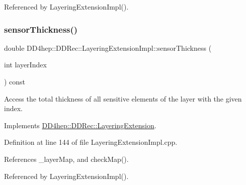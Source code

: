 Referenced by Layering\+Extension\+Impl().

\hypertarget{class_d_d4hep_1_1_d_d_rec_1_1_layering_extension_impl_a1dc384fb9845f9440a044c9b8f08c8be}{}\label{class_d_d4hep_1_1_d_d_rec_1_1_layering_extension_impl_a1dc384fb9845f9440a044c9b8f08c8be} 
\subsubsection{\texorpdfstring{sensor\+Thickness()}{sensorThickness()}}
{\footnotesize\ttfamily double D\+D4hep\+::\+D\+D\+Rec\+::\+Layering\+Extension\+Impl\+::sensor\+Thickness (\begin{DoxyParamCaption}\item[{int}]{layer\+Index }\end{DoxyParamCaption}) const\hspace{0.3cm}{\ttfamily [virtual]}}



Access the total thickness of all sensitive elements of the layer with the given index. 



Implements \hyperlink{class_d_d4hep_1_1_d_d_rec_1_1_layering_extension_a06a960f9de84690eb3383f89d1aada13}{D\+D4hep\+::\+D\+D\+Rec\+::\+Layering\+Extension}.



Definition at line 144 of file Layering\+Extension\+Impl.\+cpp.



References \+\_\+layer\+Map, and check\+Map().



Referenced by Layering\+Extension\+Impl().

\hypertarget{class_d_d4hep_1_1_d_d_rec_1_1_layering_extension_impl_a75921469ae3156903c1468cda59ce4cf}{}\label{class_d_d4hep_1_1_d_d_rec_1_1_layering_extension_impl_a75921469ae3156903c1468cda59ce4cf} 
